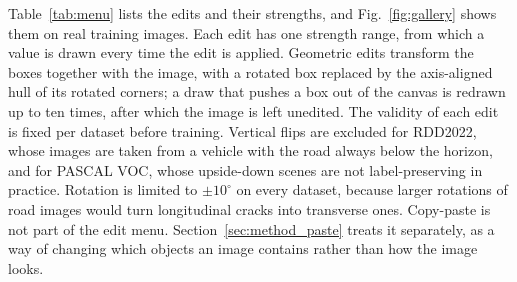 \documentclass[conference]{IEEEtran}
\begin{document}
Table~\ref{tab:menu} lists the edits and their strengths, and Fig.~\ref{fig:gallery} shows them on real training images. Each edit has one strength range, from which a value is drawn every time the edit is applied. Geometric edits transform the boxes together with the image, with a rotated box replaced by the axis-aligned hull of its rotated corners; a draw that pushes a box out of the canvas is redrawn up to ten times, after which the image is left unedited. The validity of each edit is fixed per dataset before training. Vertical flips are excluded for RDD2022, whose images are taken from a vehicle with the road always below the horizon, and for PASCAL VOC, whose upside-down scenes are not label-preserving in practice. Rotation is limited to $\pm10^\circ$ on every dataset, because larger rotations of road images would turn longitudinal cracks into transverse ones. Copy-paste is not part of the edit menu. Section~\ref{sec:method_paste} treats it separately, as a way of changing which objects an image contains rather than how the image looks.
\end{document}
